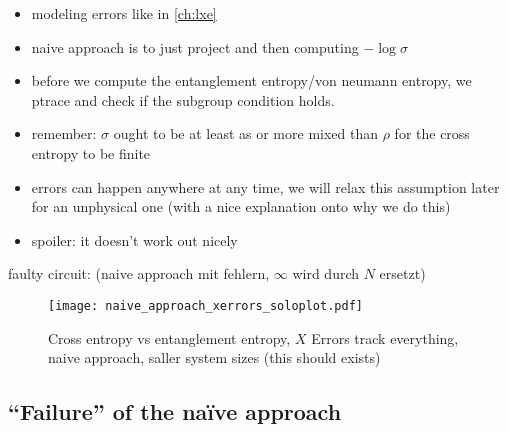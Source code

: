 \begin{itemize}
  \item modeling errors like in \cref{ch:lxe}
  \item naive approach is to just project and then computing $-\log\sigma$
  \item before we compute the entanglement entropy/von neumann entropy, we
    ptrace and check if the subgroup condition holds.
  \item remember: $\sigma$ ought to be at least as or more mixed than $\rho$
    for the cross entropy to be finite
  \item errors can happen anywhere at any time, we will relax this assumption
    later for an unphysical one (with a nice explanation onto why we do this)
  \item spoiler: it doesn't work out nicely
\end{itemize}
faulty circuit: (naive approach mit fehlern, $\infty$ wird durch $N$ ersetzt)
\begin{figure}[H]
  \centering
  \texttt{[image: naive\_approach\_xerrors\_soloplot.pdf]}
  \caption{Cross entropy vs entanglement entropy, $X$ Errors track everything,
  naive approach, saller system sizes (this should exists)}
  \label{fig:naive-svn-vs-se}
\end{figure}

\subsection{\enquote{Failure} of the na\"ive approach}

